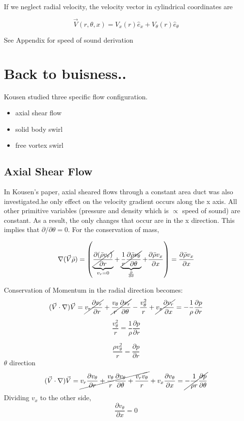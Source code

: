 If we neglect radial velocity, the velocity vector in cylindrical coordinates are

\[\vec{V}(r,\theta,x) = V_x(r) \hat{e}_x + V_{\theta} (r) \hat{e}_{\theta} \]

See Appendix for speed of sound derivation
\section{Back to buisness..}
Kousen studied three specific flow configuration.

\begin{itemize}
	\item axial shear flow
	\item solid body swirl
	\item free vortex swirl
\end{itemize}
\subsection{Axial Shear Flow}
In Kousen's paper, axial sheared flows through a constant area duct was also investigated.he only effect on the velocity gradient occurs along the x axis. All other primitive variables (pressure and density which is $\propto$ speed of sound) are constant. As a result, the only changes that occur are in the x direction. This implies that $\partial / \partial \theta = 0$. For the conservation of mass,

\[ \nabla (\vec{V}\bar{\rho}) =  \left( 
\underbrace{
	\cancel{
		\frac{\partial (\bar{\rho}v_r)	}{\partial r}
	}
}_{v_r = 0} +
\underbrace{\cancel{\frac{1}{r}	\frac{\partial \bar{\rho}v_{\theta}}{\partial \theta}}}_{\frac{\partial }{\partial \theta}} +
\frac{\partial \bar{\rho}v_x}{\partial x}
\right) = \frac{\partial \bar{\rho}v_x}{\partial x}\] 

Conservation of Momentum in the radial direction becomes:
\[(\vec{V}\cdot \nabla) \vec{V} =
\cancel{v_r \frac{\partial v_r}{\partial r}} +
\cancel{\frac{v_{\theta}  }{r}
	\frac{\partial v_r}{\partial \theta}}- \frac{v_{\theta}^2}{r}+ 
\cancel{v_x \frac{\partial v_r}{\partial x} }
= -\frac{1}{\rho} \frac{\partial p}{\partial r}
\]
\[
\frac{v_{\theta}^2}{r}
= \frac{1}{\rho} \frac{\partial p}{\partial r}
\] 

\[
\frac{{\rho} v_{\theta}^2}{r} 
=\frac{\partial p}{\partial r}
\]
$\theta$ direction
\[(\vec{V}\cdot \nabla) \vec{V} = \cancel{v_r \frac{\partial v_{\theta}}{\partial r} +
	\frac{v_{\theta}}{r}
	\frac{\partial v_{\theta}}{\partial \theta} +
	\frac{v_r v_{\theta}}{r}}+ 
v_x \frac{\partial v_{\theta}}{\partial x} 
= \cancel{-\frac{1}{\rho r} \frac{\partial p}{\partial \theta}}\]
Dividing $v_x$ to the other side,
\[ \frac{\partial v_{\theta}}{\partial x}  = 0\]

